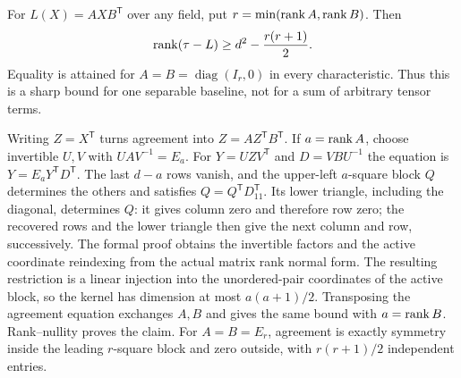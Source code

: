 \begin{proposition}\label{prop:separable-defect}
For $L(X)=AXB^{\mathsf T}$ over any field, put
$r=\min(\operatorname{rank} A,\operatorname{rank} B)$. Then
\[
 \operatorname{rank}(\tau-L)\ge d^2-\frac{r(r+1)}2.
\]
Equality is attained for $A=B=\operatorname{diag}(I_r,0)$ in every
characteristic. Thus this is a sharp bound for one separable baseline,
not for a sum of arbitrary tensor terms.
\end{proposition}
\begin{outline}
Writing $Z=X^{\mathsf T}$ turns agreement into $Z=AZ^{\mathsf T}B^{\mathsf T}$.
If $a=\operatorname{rank} A$, choose invertible $U,V$ with $UAV^{-1}=E_a$.
For $Y=UZV^{\mathsf T}$ and $D=VBU^{-1}$ the equation is
$Y=E_aY^{\mathsf T}D^{\mathsf T}$. The last $d-a$ rows vanish, and the
upper-left $a$-square block $Q$ determines the others and satisfies
$Q=Q^{\mathsf T}D_{11}^{\mathsf T}$. Its lower triangle, including the
diagonal, determines $Q$: it gives column zero and therefore row zero;
the recovered rows and the lower triangle then give the next column and
row, successively. The formal proof obtains the invertible factors and
the active coordinate reindexing from the actual matrix rank normal form.
The resulting restriction is a linear injection into the unordered-pair
coordinates of the active block, so the kernel has dimension at most
$a(a+1)/2$. Transposing the
agreement equation exchanges $A,B$ and gives the same bound with
$a=\operatorname{rank} B$. Rank--nullity proves the claim. For $A=B=E_r$, agreement
is exactly symmetry inside the leading $r$-square block and zero outside,
with $r(r+1)/2$ independent entries.
\end{outline}

